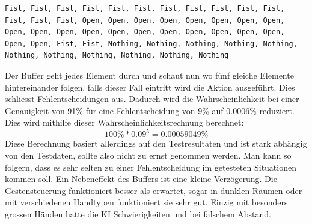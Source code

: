\documentclass[12pt]{article}
\begin{document}
\begin{lstlisting}[caption={Output KI-Resultate},label={lst:outputKI}]
Fist, Fist, Fist, Fist, Fist, Fist, Fist, Fist, Fist, Fist, Fist, Fist, Fist, Fist, Open, Open, Open, Open, Open, Open, Open, Open, Open, Open, Open, Open, Open, Open, Open, Open, Open, Open, Open, Open, Open, Fist, Fist, Nothing, Nothing, Nothing, Nothing, Nothing, Nothing, Nothing, Nothing, Nothing, Nothing, Nothing
\end{lstlisting}
Der Buffer geht jedes Element durch und schaut nun wo fünf gleiche Elemente hintereinander folgen, falls dieser Fall eintritt wird die Aktion ausgeführt. Dies schliesst Fehlentscheidungen aus. Dadurch wird die Wahrscheinlichkeit bei einer Genauigkeit von 91\% für eine Fehlentscheidung von 9\%  auf 0.0006\% reduziert.\\Dies wird mithilfe dieser Wahrscheinlichkeitsrechnung berechnet:
\[100\%*0.09^{5} = 0.00059049\%\]
Diese Berechnung basiert allerdings auf den Testresultaten und ist stark abhängig von den Testdaten, sollte also nicht zu ernst genommen werden. Man kann so folgern, dass es sehr selten zu einer Fehlentscheidung im getesteten Situationen kommen soll. Ein Nebeneffekt des Buffers ist eine kleine Verzögerung. Die Gestensteuerung funktioniert besser als erwartet, sogar in dunklen Räumen oder mit verschiedenen Handtypen funktioniert sie sehr gut. Einzig mit besonders grossen Händen hatte die KI Schwierigkeiten und bei falschem Abstand.
\end{document}
